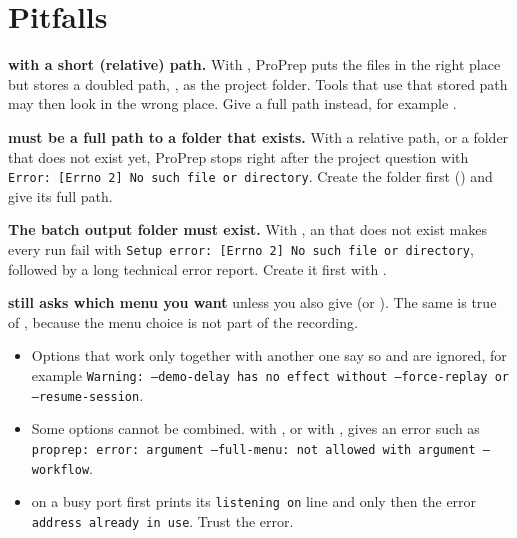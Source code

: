 \section{Pitfalls}\label{sec:cmdline-pitfalls}

\begin{watchout}
\textbf{ with a short (relative) path.} With
, ProPrep puts the files in the right place but stores a
doubled path, , as the project folder. Tools that use that
stored path may then look in the wrong place. Give a full path instead, for
example .
\end{watchout}

\begin{watchout}
\textbf{ must be a full path to a folder that exists.}
With a relative path, or a folder that does not exist yet, ProPrep stops right
after the project question with \texttt{Error: [Errno 2] No such file or
directory}. Create the folder first () and give its full path.
\end{watchout}

\begin{watchout}
\textbf{The batch output folder must exist.} With , an
 that does not exist makes every run fail with
\texttt{Setup error: [Errno 2] No such file or directory}, followed by a long
technical error report. Create it first with .
\end{watchout}

\begin{watchout}
\textbf{ still asks which menu you want} unless you also give
 (or ). The same is true of
, because the menu choice is not part of the recording.
\end{watchout}

\begin{itemize}\raggedright
  \item Options that work only together with another one say so and are
  ignored, for example
  \texttt{Warning: --demo-delay has no effect without --force-replay or
  --resume-session}.
  \item Some options cannot be combined.  with
  , or  with , gives an
  error such as
  \texttt{proprep: error: argument --full-menu: not allowed with argument
  --workflow}.
  \item {} on a busy port first prints its
  \texttt{listening on} line and only then the error
  \texttt{address already in use}. Trust the error.
\end{itemize}
